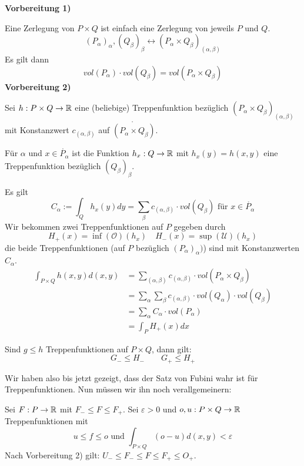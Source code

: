 \documentclass[main.tex]{subfiles}
\begin{document}
\begin{Beweis}
  \textbf{Vorbereitung 1)}

  Eine Zerlegung von $P \times Q$ ist einfach eine Zerlegung von jeweils $P$ und $Q$.
  $$(P_\alpha)_\alpha , (Q_\beta)_\beta \leftrightarrow (P_\alpha \times Q_\beta)_{(\alpha,\beta)}$$
  Es gilt dann
  $$vol(P_\alpha) \cdot vol(Q_\beta) = vol(P_\alpha \times Q_\beta)$$
  \textbf{Vorbereitung 2)}

  Sei $h: P \times Q \to \mathbb{R}$ eine (beliebige) Treppenfunktion bezüglich $(P_\alpha \times Q_\beta)_{(\alpha,\beta)}$ mit Konstanzwert $c_{(\alpha,\beta)}$ auf $\mathring{(P_\alpha \times Q_\beta)}$.

  Für $\alpha$ und $x \in \mathring{P_\alpha}$ ist die Funktion $h_x:Q \to \mathbb{R}$ mit $h_x(y)=h(x,y)$ eine Treppenfunktion bezüglich $(Q_\beta)_\beta$.

  Es gilt
  $$C_\alpha := \int_Q h_x(y)dy = \sum \limits_\beta c_{(\alpha,\beta)} \cdot vol(Q_\beta) \text{ für } x \in \mathring{P_\alpha}$$
  Wir bekommen zwei Treppenfunktionen auf $P$ gegeben durch
  $$H_+(x) = \inf(\mathcal{O})(h_x) \quad H_-(x) = \sup(\mathcal{U})(h_x)$$
  die beide Treppenfunktionen (auf $P$ bezüglich $(P_\alpha)_\alpha)$) sind mit Konstanzwerten $C_\alpha$.
  $$\begin{aligned}
    \int_{P \times Q} h(x,y)d(x,y) & = \sum \limits_{(\alpha,\beta)}c_{(\alpha,\beta)} \cdot vol(P_\alpha \times Q_\beta) \\
    & = \sum \limits_\alpha \sum \limits_\beta c_{(\alpha,\beta)} \cdot vol(Q_\alpha)\cdot vol(Q_\beta) \\
    & = \sum \limits_\alpha C_\alpha \cdot vol(P_\alpha) \\
    & = \int_P H_+(x)dx
  \end{aligned}$$

  \begin{Bemerkung}
    Sind $g \leq h$ Treppenfunktionen auf $P\times Q$, dann gilt:
    $$G_- \leq H_- \qquad G_+ \leq H_+$$
  \end{Bemerkung}

  Wir haben also bis jetzt gezeigt, dass der Satz von Fubini wahr ist für Treppenfunktionen. Nun müssen wir ihn noch verallgemeinern:

  Sei $F: P \to \mathbb{R}$ mit $F_- \leq F \leq F_+$. Sei $\varepsilon > 0$ und $o,u : P \times Q \to \mathbb{R}$ Treppenfunktionen mit
  $$u \leq f \leq o \text{ und } \int_{P \times Q} (o-u)d(x,y) < \varepsilon$$
  Nach Vorbereitung 2) gilt: $U_- \leq F_- \leq F \leq F_+ \leq O_+$.


\end{Beweis}
\end{document}
